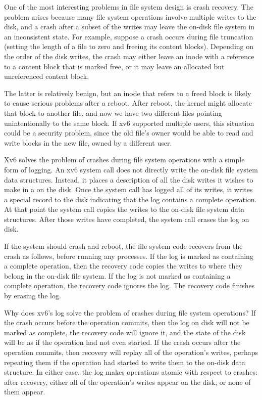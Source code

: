 One of the most interesting problems in file system design is crash
recovery. The problem arises because many file system operations
involve multiple writes to the disk, and a crash after a subset of the
writes may leave the on-disk file system in an inconsistent state. For
example, suppose a crash occurs during file truncation (setting
the length of a file to zero and freeing its content blocks).
Depending on the order of the disk writes, the crash 
may either leave an inode with a reference
to a content block that is marked free,
or it may leave an allocated but unreferenced content block.

The latter is relatively benign, but an inode that refers to a freed
block is likely to cause serious problems after a reboot.  After reboot, the
kernel might allocate that block to another file, and now we have two different
files pointing unintentionally to the same block.  If xv6 supported
multiple users, this situation could be a security problem, since the
old file's owner would be able to read and write blocks in the
new file, owned by a different user.

Xv6 solves the problem of crashes during file system operations with a
simple form of logging. An xv6 system call does not directly write
the on-disk file system data structures. Instead, it places a
description of all the disk writes it wishes to make in a 
on the disk. Once the system call has logged all of its writes, it writes a
special 
record to the disk indicating that the log contains
a complete operation. At that point the system call copies the writes
to the on-disk file system data structures. After those writes have
completed, the system call erases the log on disk.

If the system should crash and reboot, the file system code recovers
from the crash as follows, before running any processes. If the log is
marked as containing a complete operation, then the recovery code
copies the writes to where they belong in the on-disk file system. If
the log is not marked as containing a complete operation, the recovery
code ignores the log.  The recovery code finishes by erasing
the log.

Why does xv6's log solve the problem of crashes during file system
operations? If the crash occurs before the operation commits, then the
log on disk will not be marked as complete, the recovery code will
ignore it, and the state of the disk will be as if the operation had
not even started. If the crash occurs after the operation commits,
then recovery will replay all of the operation's writes, perhaps
repeating them if the operation had started to write them to the
on-disk data structure. In either case, the log makes operations
atomic with respect to crashes: after recovery, either all of the
operation's writes appear on the disk, or none of them appear.
